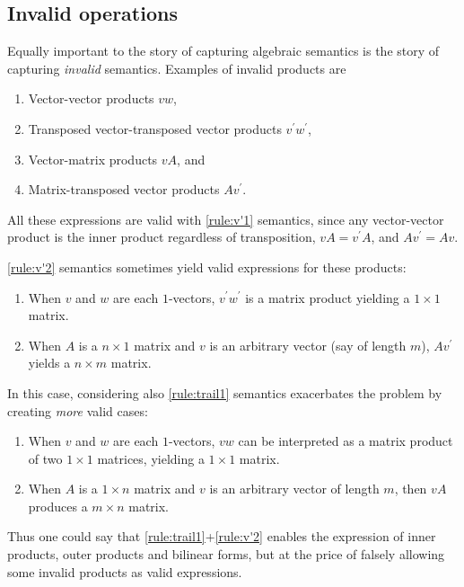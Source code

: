

\subsection{Invalid operations}

Equally important to the story of capturing algebraic semantics is the story of
capturing \textit{invalid} semantics. Examples of invalid products are

\begin{enumerate}
\item Vector-vector products $vw$,
\item Transposed vector-transposed vector products $v^\prime w^\prime$,
\item Vector-matrix products $vA$, and
\item Matrix-transposed vector products $Av^\prime$.
\end{enumerate}

All these expressions are valid with \ref{rule:v'1} semantics, since any
vector-vector product is the inner product regardless of transposition,
$vA = v^\prime A$, and $Av^\prime = Av$.

\ref{rule:v'2} semantics sometimes yield valid expressions for these products:
%
\begin{enumerate}
\item When $v$ and $w$ are each $1$-vectors, $v^\prime w^\prime$ is a matrix
product yielding a $1\times 1$ matrix.
\item When $A$ is a $n\times 1$ matrix and $v$ is an arbitrary vector (say of
length $m$), $Av^\prime$ yields a $n\times m$ matrix.
\end{enumerate}
%
In this case, considering also \ref{rule:trail1} semantics
exacerbates the problem by creating \textit{more} valid cases:
%
\begin{enumerate}
\item When $v$ and $w$ are each $1$-vectors, $vw$ can be interpreted as a
matrix product of two $1\times1$ matrices, yielding a $1\times1$ matrix.
\item When $A$ is a $1\times n$ matrix and $v$ is an arbitrary vector of length
$m$, then $vA$ produces a $m\times n$ matrix.
\end{enumerate}
%
Thus one could say that \ref{rule:trail1}+\ref{rule:v'2} enables the expression
of inner products, outer products and bilinear forms, but at the price of
falsely allowing some invalid products as valid expressions.

